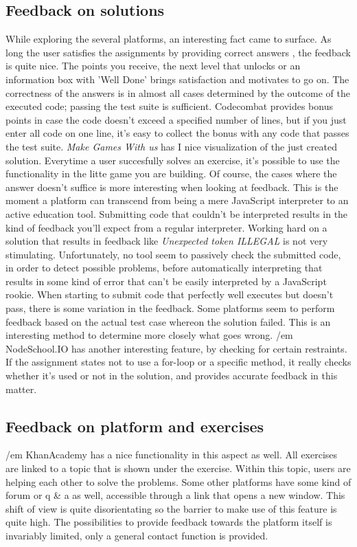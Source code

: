 \documentclass{article}
\begin{document}
\subsection{Feedback on solutions}
While exploring the several platforms, an interesting fact came to
surface. As long the user satisfies the assignments by providing correct answers
, the feedback is quite nice. The points you receive, the next level that
unlocks or an information box with 'Well Done' brings satisfaction and motivates
to go on. The correctness of the answers is in almost all cases determined by
the outcome of the executed code; passing the test suite is sufficient.
Codecombat provides bonus points in case the code doesn't exceed a specified 
number of lines, but if you just enter all code on one line, it's easy to 
collect the bonus with any code that passes the test suite. 
{\em Make Games With us} has I nice
visualization of the just created solution. Everytime a user succesfully solves
an exercise, it's possible to use the functionality in the litte game you are
building. \newline
Of course, the cases where the answer doesn't suffice is more interesting when
looking at feedback. This is the moment a platform can transcend from being a
mere JavaScript interpreter to an active education tool. Submitting code that 
couldn't be interpreted results in the kind of feedback you'll expect from a 
regular interpreter. Working hard on a solution that results in feedback like 
{\em Unexpected token ILLEGAL} is not very stimulating. Unfortunately, no tool 
seem to passively check the submitted code, in order to detect possible
problems, before automatically interpreting that results in some kind of error
that can't be easily interpreted by a JavaScript rookie. 
\newline When starting to submit code that perfectly well executes but doesn't
pass, there is
some variation in the feedback. Some platforms seem to perform feedback based 
on the actual test case whereon the solution failed. This is an interesting 
method to determine more closely what goes wrong. {/em NodeSchool.IO} has another 
interesting feature, by checking for certain restraints. If the assignment 
states not to use a for-loop or a specific method, it really checks whether 
it's used or not in the solution, and provides accurate feedback in this matter.

\subsection{Feedback on platform and exercises}
{/em KhanAcademy} has a nice functionality in this aspect as well. All exercises are 
linked to a topic that is shown under the exercise. Within this topic, users are 
helping each other to solve the problems. Some other platforms have some kind
of forum or q \& a as well, accessible through a link that opens a new window. 
This shift of view is quite disorientating so the barrier to make use 
of this feature is quite high. The possibilities to provide feedback towards the 
platform itself is invariably limited, only a general contact function is 
provided. 
\end{document}
